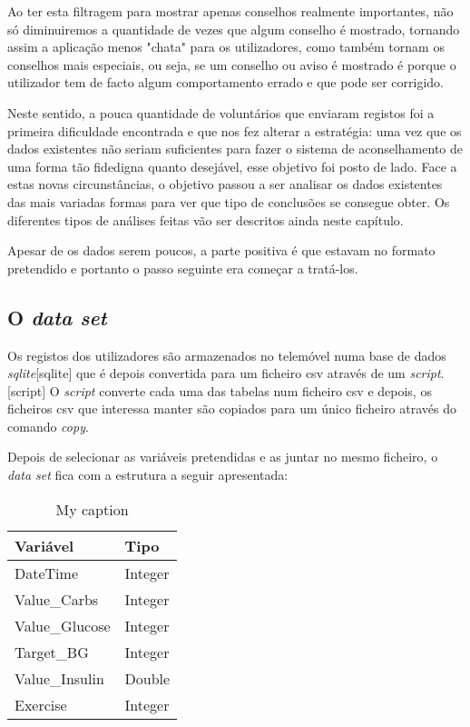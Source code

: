 Ao ter esta filtragem para mostrar apenas conselhos realmente importantes, não só diminuiremos a quantidade de vezes que algum conselho é mostrado, tornando assim a aplicação menos "chata" para os utilizadores, como também tornam os conselhos mais especiais, ou seja, se um conselho ou aviso é mostrado é porque o utilizador tem de facto algum comportamento errado e que pode ser corrigido.

Neste sentido, a pouca quantidade de voluntários que enviaram registos foi a primeira dificuldade encontrada e que nos fez alterar a estratégia: uma vez que os dados existentes não seriam suficientes para fazer o sistema de aconselhamento de uma forma tão fidedigna quanto desejável, esse objetivo foi posto de lado. Face a estas novas circunstâncias, o objetivo passou a ser analisar os dados existentes das mais variadas formas para ver que tipo de conclusões se consegue obter. Os diferentes tipos de análises feitas vão ser descritos ainda neste capítulo.

Apesar de os dados serem poucos, a parte positiva é que estavam no formato pretendido e portanto o passo seguinte era começar a tratá-los.


\subsection{O \textit{data set}}

Os registos dos utilizadores são armazenados no telemóvel numa base de dados \textit{sqlite}[sqlite] que é depois convertida para um ficheiro csv através de um \textit{script}.[script] O \textit{script} converte cada uma das tabelas num ficheiro csv e depois, os ficheiros csv que interessa manter são copiados para um único ficheiro através do comando \textit{copy}.

Depois de selecionar as variáveis pretendidas e as juntar no mesmo ficheiro, o \textit{data set} fica com a estrutura a seguir apresentada:
 

\begin{table}[H]
\centering

\label{my-label}
\begin{tabular}{|l|l|}
\hline
\textbf{Variável} & \textbf{Tipo} \\ \hline
DateTime          & Integer       \\ \hline
Value\_Carbs      & Integer       \\ \hline
Value\_Glucose    & Integer       \\ \hline
Target\_BG        & Integer       \\ \hline
Value\_Insulin    & Double        \\ \hline
Exercise          & Integer       \\ \hline
\end{tabular}
\caption{My caption}
\end{table}

